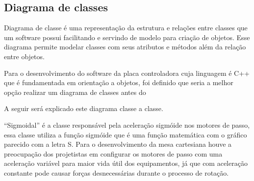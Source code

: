 \subsection{Diagrama de classes}\label{subsec:metdiagrama}

Diagrama de classe é uma representação da estrutura e relações entre classes que um software possui 
facilitando e servindo de modelo para criação de objetos. Esse diagrama permite modelar classes com seus 
atributos e métodos além da relação entre objetos.

Para o desenvolvimento do software da placa controladora cuja linguagem é C++ que é fundamentada em 
orientação a objetos, foi definido que seria a melhor opção realizar um diagrama de classes antes do 

    
A seguir será explicado este diagrama classe a classe.

“Sigmoidal” é a classe responsável pela aceleração sigmóide nos motores de passo, essa classe utiliza 
a função sigmóide que é uma função matemática com o gráfico parecido com a letra S. Para o desenvolvimento 
da mesa cartesiana houve a preocupação dos projetistas em configurar os motores de passo com uma aceleração 
variável para maior vida útil dos equipamentos, já que com aceleração constante pode causar forças 
desnecessárias durante o processo de rotação.


